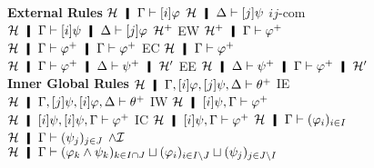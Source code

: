 {%




\begin{figure}
 \small
\centering
  \textbf{External Rules}
   \vskip 2mm
   \BinaryRule
   {$\hyper\hmid\G\vdash[i]\phi$}
   {$\hyper\hmid\D\vdash[j]\psi$}
   {$ij$-com}
   {$\hyper\hmid\Gamma\vdash[i]\psi\hmid\Delta\vdash[j]\varphi$}
  \hfill
 \UnaryRule
 {$\mathcal{H}^+$}
 {EW}
 {$\hyper^+\hmid\Gamma\vdash \m\varphi$}
 \vskip 2mm
 \UnaryRule
 {$\hyper\hmid\Gamma\vdash \m\phi\hmid\Gamma\vdash \m\phi$}
 {EC}
 {$\hyper\hmid\Gamma\vdash \m\phi$}
 \hfill
 \UnaryRule
 {$\hyper\hmid\Gamma\vdash \m\varphi\hmid\Delta\vdash \m\psi\hmid \hyper'$}
 {EE}
 {$\hyper\hmid\Delta\vdash \m\psi   \hmid\Gamma\vdash \m\varphi\hmid
   \hyper'$}
 \vskip 2mm
\textbf{Inner Global Rules}
\vskip 2mm
   \UnaryRule
   {$\hyper\hmid\Gamma,[i]\phi,[j]\psi,\Delta\tr\m\theta$}
   {IE}
   {$\hyper\hmid\Gamma,[j]\psi,[i]\phi,\Delta\tr\m\theta$}
   \hfill
   \UnaryRule{$\hyper\hmid\Gamma\vdash\m\varphi$}
   {IW}
   {$\hyper\hmid[i]\psi,\Gamma\vdash\m\varphi$}
   \hfill
   \UnaryRule
   {$\hyper\hmid[i]\psi,[i]\psi,\G\vdash\m\varphi$}
   {IC}
   {$\hyper\hmid[i]\psi,        \G\vdash\m\varphi$}
 \BinaryRule
 {$\hyper\hmid\G\tr(\phi_i)_{i\in I}$}
 {$\hyper\hmid\G\tr(\psi_j)_{j\in J}$}
 {$\wedge\mathcal I$}
 {$\hyper\hmid\G\tr(\phi_k\land\psi_k)_{k\in I\cap J}\sqcup
 (\phi_i)_{i\in I\setminus J}\sqcup (\psi_j)_{j\in J\setminus I}$}


\end{figure}}

